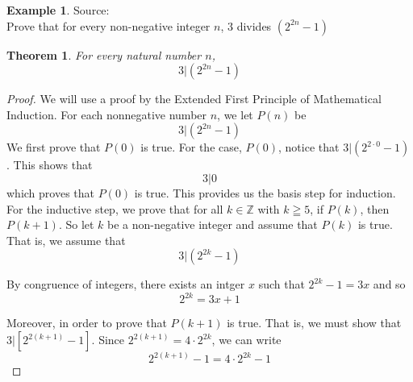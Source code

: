 \documentclass{book}
\newtheorem{theorem}{Theorem}[section]
\theoremstyle{definition}
\newtheorem{example}{Example}[definition]
\theoremstyle{remark}
\newcommand{\bb}[1]{\mathbb{#1}}
\newcommand{\m}{\cdot}
\begin{document}
\newpage
\begin{example}
Source: \cite[Chap.6, S.6.2, Result 6.11]{gray} \\ 

Prove that for every non-negative integer $n$, $3$ divides $(2^{2n} - 1)$
\begin{tcolorbox}
    \begin{theorem}
        For every natural number $n$,
        \begin{equation*}
            3 | (2^{2n} - 1)
        \end{equation*}
    \end{theorem}
\end{tcolorbox}

\begin{proof}
    We will use a proof by the Extended First Principle of Mathematical Induction. For each nonnegative number $n$, we let $P(n)$ be
        \begin{equation*}
            3 | (2^{2n} - 1)
        \end{equation*}
    We first prove that $P(0)$ is true. For the case, $P(0)$, notice that $ 3 | (2^{2 \m 0} - 1)$. This shows that   
        \begin{equation*}
            3 | 0
        \end{equation*}
    which proves that $P(0)$ is true. This provides us the basis step for induction. \\ 
    
    For the inductive step, we prove that for all $k \in \bb{Z}$ with $k \geqq 5$, if $P(k)$, then $P(k+1)$. So let $k$ be a non-negative integer and assume that $P(k)$ is true. That is, we assume that 
        \begin{equation*}
           3 | (2^{2k} -1)
        \end{equation*}
    
    By congruence of integers, there exists an intger $x$ such that $2^{2k} - 1 = 3x $ and so 
        \begin{equation}
        \label{dsf1} 
            2^{2k} = 3x + 1 
        \end{equation}
    
    Moreover, in order to prove that $P(k+1)$ is true. That is, we must show that $3 | [2^{2(k+1)} - 1]$. Since $2^{2(k+1)} = 4 \m 2^{2k}$, we can write
        \begin{equation}
        \label{dsf2}
            2^{2(k+1)} - 1 = 4 \m 2^{2k} - 1
        \end{equation}
    

\end{proof}
\end{example}
\end{document}
